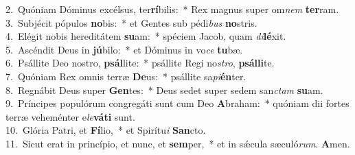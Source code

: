 {2.~}Quóniam Dóminus excélsus, ter\textbf{rí}bilis:~* Rex magnus super om\textit{nem} \textbf{ter}ram.\\
{3.~}Subjécit pópulos \textbf{no}bis:~* et Gentes sub pédi\textit{bus} \textbf{no}stris.\\
{4.~}Elégit nobis hereditátem \textbf{su}am:~* spéciem Jacob, quam \textit{di}\textbf{lé}xit.\\
{5.~}Ascéndit Deus in \textbf{jú}bilo:~* et Dóminus in vo\textit{ce} \textbf{tu}bæ.\\
{6.~}Psállite Deo nostro, \textbf{psál}lite:~* psállite Regi no\textit{stro}, \textbf{psál}\textbf{li}te.\\
{7.~}Quóniam Rex omnis terræ \textbf{De}us:~* psállite sa\textit{pi}\textbf{én}ter.\\
{8.~}Regnábit Deus super \textbf{Gen}tes:~* Deus sedet super sedem san\textit{ctam} \textbf{su}am.\\
{9.~}Príncipes populórum congregáti sunt cum Deo \textbf{A}braham:~* quóniam dii fortes terræ veheménter e\textit{le}\textbf{vá}\textbf{ti} sunt.\\
{10.~}Glória Patri, et \textbf{Fí}lio,~* et Spirítu\textit{i} \textbf{San}cto.\\
{11.~}Sicut erat in princípio, et nunc, et \textbf{sem}per,~* et in sǽcula sæculó\textit{rum}. \textbf{A}men.\\

